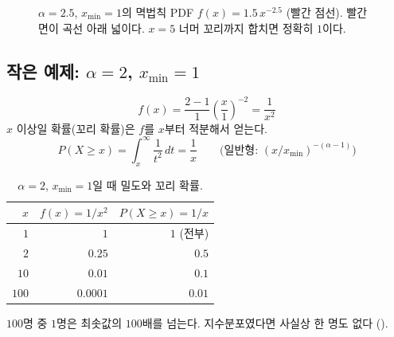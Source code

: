 \documentclass[11pt]{article}
\begin{document}
\begin{figure}[H]
  \centering
  \caption{$\alpha = 2.5$, $x_{\min} = 1$의 멱법칙 PDF $f(x) = 1.5\,x^{-2.5}$
  (빨간 점선). 빨간 면이 곡선 아래 넓이다. $x = 5$ 너머 꼬리까지 합치면
  정확히 $1$이다.}
  \label{fig:powerlaw-area}
\end{figure}

\subsection{작은 예제: $\alpha = 2$, $x_{\min} = 1$}
\label{sec:why-example}

\[
  f(x) = \frac{2-1}{1}\left(\frac{x}{1}\right)^{-2} = \frac{1}{x^2}
\]
$x$ 이상일 확률(꼬리 확률)은 $f$를 $x$부터 적분해서 얻는다.
\[
  P(X \ge x) = \int_{x}^{\infty} \frac{1}{t^2}\,dt = \frac{1}{x}
  \qquad \text{(일반형: $(x/x_{\min})^{-(\alpha-1)}$)}
\]

\begin{table}[H]
  \centering
  \caption{$\alpha = 2$, $x_{\min} = 1$일 때 밀도와 꼬리 확률.}
  \label{tab:why-example}
  \begin{tabular}{rrr}
    \toprule
    $x$ & $f(x) = 1/x^2$ & $P(X \ge x) = 1/x$ \\
    \midrule
    $1$ & $1$ & $1$ (전부) \\
    \midrule
    $2$ & $0.25$ & $0.5$ \\
    \midrule
    $10$ & $0.01$ & $0.1$ \\
    \midrule
    $100$ & $0.0001$ & $0.01$ \\
    \bottomrule
  \end{tabular}
\end{table}

$100$명 중 $1$명은 최솟값의 $100$배를 넘는다. 지수분포였다면 사실상 한 명도 없다
().
\end{document}
